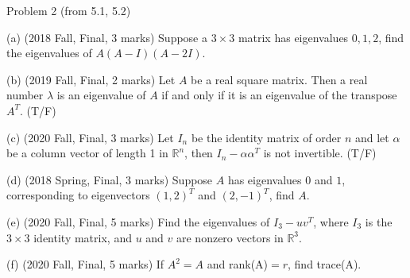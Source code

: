 \documentclass{beamer}
\begin{document}
\begin{frame}{Problem 2 (from 5.1, 5.2)}
\begin{example}

    (a) (2018 Fall, Final, 3 marks) Suppose a $3\times 3$ matrix has eigenvalues $0, 1, 2$, find the eigenvalues of $A(A-I)(A-2I)$.

    \vspace{3pt}
    (b) (2019 Fall, Final, 2 marks) Let $A$ be a real square matrix. Then a real number $\lambda$ is an eigenvalue of $A$ if and only if it is an eigenvalue of the transpose $A^T$. (T/F)

    \vspace{3pt}
    (c) (2020 Fall, Final, 3 marks) Let $I_n$ be the identity matrix of order $n$ and let $\alpha$ be a column vector of length 1 in $\mathbb{R}^n$, then $I_n-\alpha \alpha ^T$ is not invertible. (T/F)

    \vspace{3pt}
    (d) (2018 Spring, Final, 3 marks) Suppose $A$ has eigenvalues $0$ and $1$, corresponding to eigenvectors $(1,2)^T$ and $(2,-1)^T$, find $A$.

    \vspace{3pt}
    (e) (2020 Fall, Final, 5 marks) Find the eigenvalues of $I_3-uv^T$, where $I_3$ is the $3\times 3$ identity matrix, and $u$ and $v$ are nonzero vectors in $\mathbb{R}^3$.

    \vspace{3pt}
    (f) (2020 Fall, Final, 5 marks) If $A^2=A$ and rank(A)$=r$, find trace(A).
\end{example}
\end{frame}
\end{document}
